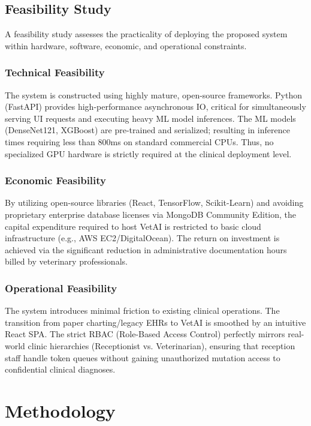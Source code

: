 \documentclass[a4paper,12pt]{report}
\begin{document}
\section{Feasibility Study}

A feasibility study assesses the practicality of deploying the proposed system within hardware, software, economic, and operational constraints.

\subsection{Technical Feasibility}
The system is constructed using highly mature, open-source frameworks. Python (FastAPI) provides high-performance asynchronous IO, critical for simultaneously serving UI requests and executing heavy ML model inferences. The ML models (DenseNet121, XGBoost) are pre-trained and serialized; resulting in inference times requiring less than 800ms on standard commercial CPUs. Thus, no specialized GPU hardware is strictly required at the clinical deployment level.

\subsection{Economic Feasibility}
By utilizing open-source libraries (React, TensorFlow, Scikit-Learn) and avoiding proprietary enterprise database licenses via MongoDB Community Edition, the capital expenditure required to host VetAI is restricted to basic cloud infrastructure (e.g., AWS EC2/DigitalOcean). The return on investment is achieved via the significant reduction in administrative documentation hours billed by veterinary professionals.

\subsection{Operational Feasibility}
The system introduces minimal friction to existing clinical operations. The transition from paper charting/legacy EHRs to VetAI is smoothed by an intuitive React SPA. The strict RBAC (Role-Based Access Control) perfectly mirrors real-world clinic hierarchies (Receptionist vs. Veterinarian), ensuring that reception staff handle token queues without gaining unauthorized mutation access to confidential clinical diagnoses.


\chapter{Methodology}
\end{document}
